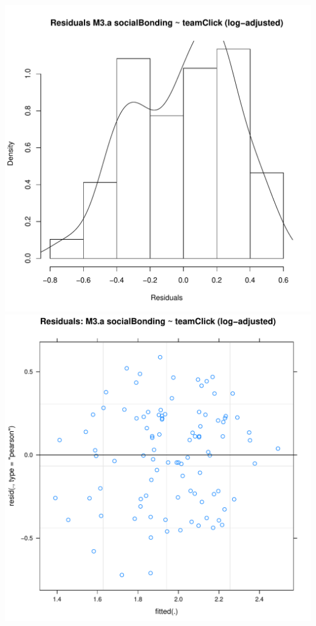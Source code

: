 \documentclass[12pt]{report}
\begin{document}
\newpage
\centering
\includegraphics[scale =.4]{../images/MLM3aLogHist.pdf}
\includegraphics[scale =.4]{../images/MLM3aLogScatter.pdf}
\end{document}
